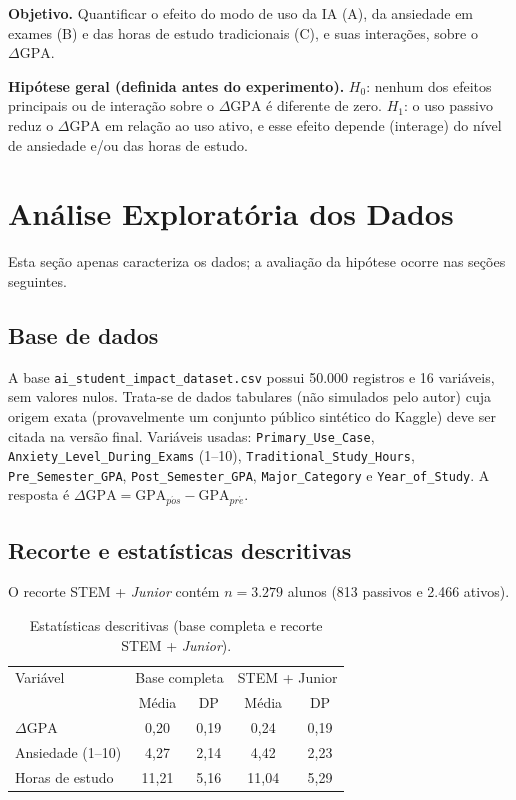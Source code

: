 \documentclass[12pt,a4paper]{article}
\newcommand{\dgpa}{\ensuremath{\Delta\mathrm{GPA}}}
\begin{document}
\textbf{Objetivo.} Quantificar o efeito do modo de uso da IA (A), da ansiedade em exames (B) e das horas de estudo
tradicionais (C), e suas intera\c{c}\~oes, sobre o \dgpa{}.

\textbf{Hip\'otese geral (definida antes do experimento).} $H_0$: nenhum dos efeitos principais ou de intera\c{c}\~ao
sobre o \dgpa{} \'e diferente de zero. $H_1$: o uso passivo reduz o \dgpa{} em relação ao uso ativo, e esse efeito
depende (interage) do n\'ivel de ansiedade e/ou das horas de estudo.

\section{An\'alise Explorat\'oria dos Dados}
Esta se\c{c}\~ao apenas caracteriza os dados; a avalia\c{c}\~ao da hip\'otese ocorre nas se\c{c}\~oes seguintes.

\subsection{Base de dados}
A base \texttt{ai\_student\_impact\_dataset.csv} possui 50.000 registros e 16 vari\'aveis, sem valores nulos. Trata-se de dados
tabulares (n\~ao simulados pelo autor) cuja origem exata (provavelmente um conjunto p\'ublico sint\'etico do Kaggle) deve
ser citada na vers\~ao final. Vari\'aveis usadas: \texttt{Primary\_Use\_Case}, \texttt{Anxiety\_Level\_During\_Exams} (1--10),
\texttt{Traditional\_Study\_Hours}, \texttt{Pre\_Semester\_GPA}, \texttt{Post\_Semester\_GPA}, \texttt{Major\_Category} e \texttt{Year\_of\_Study}.
A resposta \'e $\dgpa{}=\text{GPA}_{p\acute{o}s}-\text{GPA}_{pr\acute{e}}$.

\subsection{Recorte e estat\'isticas descritivas}
O recorte STEM + \emph{Junior} cont\'em $n=3.279$ alunos (813 passivos e 2.466 ativos).

\begin{table}[H]
\centering
\caption{Estat\'isticas descritivas (base completa e recorte STEM + \emph{Junior}).}
\begin{tabular}{lcccc}
\toprule
Vari\'avel & \multicolumn{2}{c}{Base completa} & \multicolumn{2}{c}{STEM + Junior}\\
 & M\'edia & DP & M\'edia & DP\\
\midrule
\dgpa{} & 0,20 & 0,19 & 0,24 & 0,19\\
Ansiedade (1--10) & 4,27 & 2,14 & 4,42 & 2,23\\
Horas de estudo & 11,21 & 5,16 & 11,04 & 5,29\\
\bottomrule
\end{tabular}
\end{table}
\end{document}
